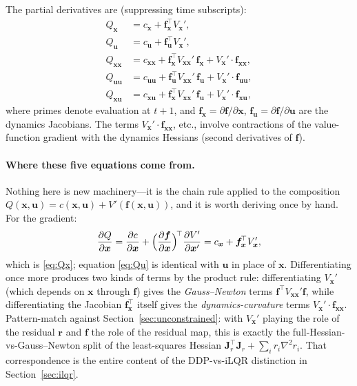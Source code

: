 \documentclass[11pt,twoside]{report}
\theoremstyle{definition}
\theoremstyle{plain}
\theoremstyle{remark}
\newcommand{\x}{\bm{x}}
\newcommand{\uu}{\bm{u}}
\newcommand{\f}{\bm{f}}
\newcommand{\rr}{\bm{r}}
\newcommand{\0}{\bm{0}}
\newcommand{\J}{\bm{J}}
\begin{document}
The partial derivatives are (suppressing time subscripts):
\begin{align}
Q_{\x}&=c_{\x}+\f_{\x}^{\!\top}V_{\x}',\label{eq:Qx}\\
Q_{\uu}&=c_{\uu}+\f_{\uu}^{\!\top}V_{\x}',\label{eq:Qu}\\
Q_{\x\x}&=c_{\x\x}+\f_{\x}^{\!\top}V_{\x\x}'\,\f_{\x}
+V_{\x}'\cdot\f_{\x\x},\label{eq:Qxx}\\
Q_{\uu\uu}&=c_{\uu\uu}+\f_{\uu}^{\!\top}V_{\x\x}'\,\f_{\uu}
+V_{\x}'\cdot\f_{\uu\uu},\label{eq:Quu}\\
Q_{\x\uu}&=c_{\x\uu}+\f_{\x}^{\!\top}V_{\x\x}'\,\f_{\uu}
+V_{\x}'\cdot\f_{\x\uu},\label{eq:Qxu}
\end{align}
where primes denote evaluation at $t{+}1$, and
$\f_{\x}=\partial\f/\partial\x$,
$\f_{\uu}=\partial\f/\partial\uu$ are the dynamics Jacobians.
The terms $V_{\x}'\cdot\f_{\x\x}$, etc., involve contractions of the
value-function gradient with the dynamics Hessians (second derivatives of $\f$).

\paragraph{Where these five equations come from.}
Nothing here is new machinery---it is the chain rule applied to the
composition $Q(\x,\uu)=c(\x,\uu)+V'(\f(\x,\uu))$, and it is worth
deriving once by hand. For the gradient:
\begin{equation*}
\frac{\partial Q}{\partial\x}
=\frac{\partial c}{\partial\x}
+\Bigl(\frac{\partial\f}{\partial\x}\Bigr)^{\!\top}
\frac{\partial V'}{\partial\x'}
=c_{\x}+\f_{\x}^{\!\top}V_{\x}',
\end{equation*}
which is \eqref{eq:Qx}; equation \eqref{eq:Qu} is identical with
$\uu$ in place of $\x$. Differentiating once more produces two kinds of
terms by the product rule: differentiating $V_{\x}'$ (which depends on
$\x$ through $\f$) gives the \emph{Gauss--Newton} terms
$\f^{\!\top}V_{\x\x}'\f$, while differentiating the Jacobian
$\f_{\x}^{\!\top}$ itself gives the \emph{dynamics-curvature} terms
$V_{\x}'\cdot\f_{\x\x}$.
Pattern-match against Section~\ref{sec:unconstrained}: with
$V_{\x}'$ playing the role of the residual $\rr$ and $\f$ the role of
the residual map, this is exactly the full-Hessian-vs-Gauss--Newton
split of the least-squares Hessian
$\J_{r}^{\!\top}\J_{r}+\sum_{i}r_{i}\nabla^{2}r_{i}$.
That correspondence is the entire content of the DDP-vs-iLQR
distinction in Section~\ref{sec:ilqr}.

\end{document}
